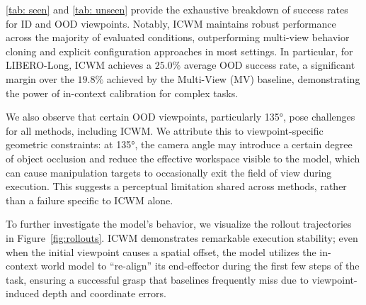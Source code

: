 \documentclass{llmxive}
\begin{document}
\autoref{tab: seen} and \autoref{tab: unseen} provide the exhaustive breakdown of success rates for ID and OOD viewpoints. 
Notably, ICWM maintains robust performance across the majority of evaluated conditions, outperforming multi-view behavior cloning and explicit configuration approaches in most settings.
In particular, for LIBERO-Long, ICWM achieves a $25.0\%$ average OOD success rate, a significant margin over the $19.8\%$ achieved by the Multi-View (MV) baseline, demonstrating the power of in-context calibration for complex tasks. 

We also observe that certain OOD viewpoints, particularly 135°, pose challenges for all methods, including ICWM. We attribute this to viewpoint-specific geometric constraints: at 135°, the camera angle may introduce a certain degree of object occlusion and reduce the effective workspace visible to the model, which can cause manipulation targets to occasionally exit the field of view during execution. This suggests a perceptual limitation shared across methods, rather than a failure specific to ICWM alone.

To further investigate the model's behavior, we visualize the rollout trajectories in Figure~\ref{fig:rollouts}. ICWM demonstrates remarkable execution stability; even when the initial viewpoint causes a spatial offset, the model utilizes the in-context world model to ``re-align'' its end-effector during the first few steps of the task, ensuring a successful grasp that baselines frequently miss due to viewpoint-induced depth and coordinate errors.
\end{document}

